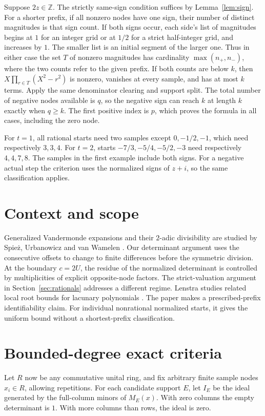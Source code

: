 \documentclass[10pt]{article}
\newcommand{\Z}{\mathbb Z}
\begin{document}
Suppose $2z\in\Z$. The strictly same-sign condition suffices by
Lemma~\ref{lem:sign}. For a shorter prefix, if all nonzero nodes
have one sign, their number of distinct magnitudes is that sign count.
If both signs occur, each side's list of magnitudes begins at $1$
for an integer grid or at $1/2$ for a strict half-integer grid,
and increases by $1$. The smaller list is an initial segment of
the larger one. Thus in either case the set $T$ of nonzero magnitudes
has cardinality $\max(n_+,n_-)$, where the two counts refer to the
given prefix. If both counts are below $k$, then
$X\prod_{r\in T}(X^2-r^2)$ is nonzero, vanishes at every sample,
and has at most $k$ terms. Apply the same denominator clearing
and support split. The total number of negative nodes available is
$q$, so the negative sign can reach $k$ at length $k$ exactly
when $q\ge k$. The first positive index is $p$, which proves
the formula in all cases, including the zero node.

For $t=1$, all rational starts need two samples except
$0,-1/2,-1$, which need respectively $3,3,4$. For $t=2$,
starts $-7/3,-5/4,-5/2,-3$ need respectively $4,4,7,8$.
The samples in the first example include both signs. For a
negative actual step the criterion uses the normalized signs of
$z+i$, so the same classification applies.

\section{Context and scope}
Generalized Vandermonde expansions and their $2$-adic divisibility
are studied by Spie\.z, Urbanowicz and van Wamelen \cite{vandermonde}.
Our determinant argument uses the consecutive offsets to change to
finite differences before the symmetric division. At the boundary
$c=2U$, the residue of the normalized determinant is controlled by
multiplicities of explicit opposite-node factors. The strict-valuation
argument in Section~\ref{sec:rationals} addresses a different regime.
Lenstra studies related local root bounds for lacunary polynomials
\cite{lenstra}. The paper makes a prescribed-prefix identifiability
claim. For individual nonrational normalized starts, it gives the
uniform bound without a shortest-prefix classification.

\appendix
\section{Bounded-degree exact criteria}\label{app:degree}
Let $R$ now be any commutative unital ring, and fix arbitrary finite
sample nodes $x_i\in R$, allowing repetitions. For each candidate
support $E$, let $I_E$ be the ideal generated by the full-column
minors of $M_E(x)$. With zero columns the empty determinant is $1$.
With more columns than rows, the ideal is zero.
\end{document}

